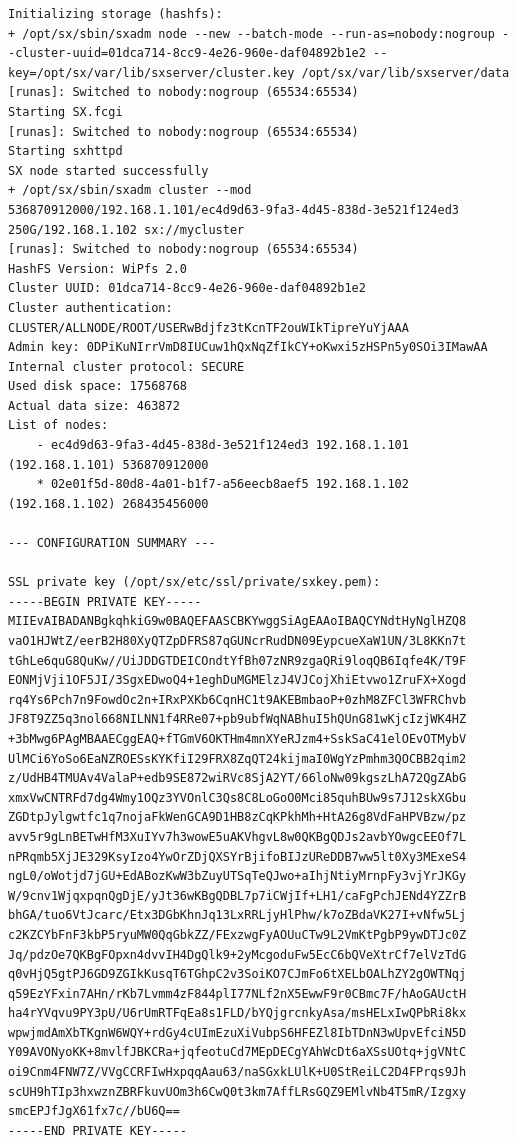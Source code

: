 \begin{lstlisting}
Initializing storage (hashfs):
+ /opt/sx/sbin/sxadm node --new --batch-mode --run-as=nobody:nogroup --cluster-uuid=01dca714-8cc9-4e26-960e-daf04892b1e2 --key=/opt/sx/var/lib/sxserver/cluster.key /opt/sx/var/lib/sxserver/data
[runas]: Switched to nobody:nogroup (65534:65534)
Starting SX.fcgi
[runas]: Switched to nobody:nogroup (65534:65534)
Starting sxhttpd
SX node started successfully
+ /opt/sx/sbin/sxadm cluster --mod 536870912000/192.168.1.101/ec4d9d63-9fa3-4d45-838d-3e521f124ed3 250G/192.168.1.102 sx://mycluster
[runas]: Switched to nobody:nogroup (65534:65534)
HashFS Version: WiPfs 2.0
Cluster UUID: 01dca714-8cc9-4e26-960e-daf04892b1e2
Cluster authentication:
CLUSTER/ALLNODE/ROOT/USERwBdjfz3tKcnTF2ouWIkTipreYuYjAAA
Admin key: 0DPiKuNIrrVmD8IUCuw1hQxNqZfIkCY+oKwxi5zHSPn5y0SOi3IMawAA
Internal cluster protocol: SECURE
Used disk space: 17568768
Actual data size: 463872
List of nodes:
    - ec4d9d63-9fa3-4d45-838d-3e521f124ed3 192.168.1.101 (192.168.1.101) 536870912000
    * 02e01f5d-80d8-4a01-b1f7-a56eecb8aef5 192.168.1.102 (192.168.1.102) 268435456000

--- CONFIGURATION SUMMARY ---

SSL private key (/opt/sx/etc/ssl/private/sxkey.pem):
-----BEGIN PRIVATE KEY-----
MIIEvAIBADANBgkqhkiG9w0BAQEFAASCBKYwggSiAgEAAoIBAQCYNdtHyNglHZQ8
vaO1HJWtZ/eerB2H80XyQTZpDFRS87qGUNcrRudDN09EypcueXaW1UN/3L8KKn7t
tGhLe6quG8QuKw//UiJDDGTDEICOndtYfBh07zNR9zgaQRi9loqQB6Iqfe4K/T9F
EONMjVji1OF5JI/3SgxEDwoQ4+1eghDuMGMElzJ4VJCojXhiEtvwo1ZruFX+Xogd
rq4Ys6Pch7n9FowdOc2n+IRxPXKb6CqnHC1t9AKEBmbaoP+0zhM8ZFCl3WFRChvb
JF8T9ZZ5q3nol668NILNN1f4RRe07+pb9ubfWqNABhuI5hQUnG81wKjcIzjWK4HZ
+3bMwg6PAgMBAAECggEAQ+fTGmV6OKTHm4mnXYeRJzm4+SskSaC41elOEvOTMybV
UlMCi6YoSo6EaNZROESsKYKfiI29FRX8ZqQT24kijmaI0WgYzPmhm3QOCBB2qim2
z/UdHB4TMUAv4ValaP+edb9SE872wiRVc8SjA2YT/66loNw09kgszLhA72QgZAbG
xmxVwCNTRFd7dg4Wmy1OQz3YVOnlC3Qs8C8LoGoO0Mci85quhBUw9s7J12skXGbu
ZGDtpJylgwtfc1q7nojaFkWenGCA9D1HB8zCqKPkhMh+HtA26g8VdFaHPVBzw/pz
avv5r9gLnBETwHfM3XuIYv7h3wowE5uAKVhgvL8w0QKBgQDJs2avbYOwgcEEOf7L
nPRqmb5XjJE329KsyIzo4YwOrZDjQXSYrBjifoBIJzUReDDB7ww5lt0Xy3MExeS4
ngL0/oWotjd7jGU+EdABozKwW3bZuyUTSqTeQJwo+aIhjNtiyMrnpFy3vjYrJKGy
W/9cnv1WjqxpqnQgDjE/yJt36wKBgQDBL7p7iCWjIf+LH1/caFgPchJENd4YZZrB
bhGA/tuo6VtJcarc/Etx3DGbKhnJq13LxRRLjyHlPhw/k7oZBdaVK27I+vNfw5Lj
c2KZCYbFnF3kbP5ryuMW0QqGbkZZ/FExzwgFyAOUuCTw9L2VmKtPgbP9ywDTJc0Z
Jq/pdzOe7QKBgFOpxn4dvvIH4DgQlk9+2yMcgoduFw5EcC6bQVeXtrCf7elVzTdG
q0vHjQ5gtPJ6GD9ZGIkKusqT6TGhpC2v3SoiKO7CJmFo6tXELbOALhZY2gOWTNqj
q59EzYFxin7AHn/rKb7Lvmm4zF844plI77NLf2nX5EwwF9r0CBmc7F/hAoGAUctH
ha4rYVqvu9PY3pU/U6rUmRTFqEa8s1FLD/bYQjgrcnkyAsa/msHELxIwQPbRi8kx
wpwjmdAmXbTKgnW6WQY+rdGy4cUImEzuXiVubpS6HFEZl8IbTDnN3wUpvEfciN5D
Y09AVONyoKK+8mvlfJBKCRa+jqfeotuCd7MEpDECgYAhWcDt6aXSsUOtq+jgVNtC
oi9Cnm4FNW7Z/VVgCCRFIwHxpqqAau63/naSGxkLUlK+U0StReiLC2D4FPrqs9Jh
scUH9hTIp3hxwznZBRFkuvUOm3h6CwQ0t3km7AffLRsGQZ9EMlvNb4T5mR/Izgxy
smcEPJfJgX61fx7c//bU6Q==
-----END PRIVATE KEY-----



\end{lstlisting}
